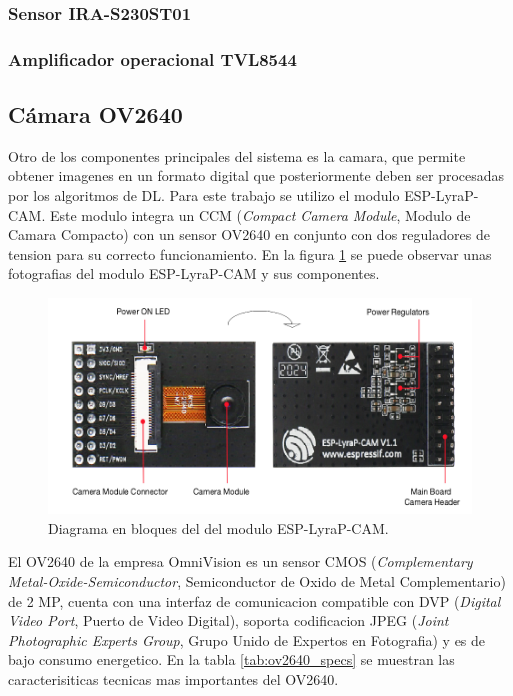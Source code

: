 \subsubsection{Sensor IRA-S230ST01}


\subsubsection{Amplificador operacional TVL8544}

\subsection{Cámara OV2640}
Otro de los componentes principales del sistema es la camara, que permite obtener imagenes en un formato digital que posteriormente deben ser procesadas por los algoritmos de DL. Para este trabajo se utilizo el modulo ESP-LyraP-CAM. Este modulo integra un CCM (\textit{Compact Camera Module}, Modulo de Camara Compacto) con un sensor OV2640 en conjunto con dos reguladores de tension para su correcto funcionamiento. En la figura \ref{fig:camera_blocks} se puede observar unas fotografias del modulo ESP-LyraP-CAM y sus componentes.

\begin{figure}[h]
	\centering
	\includegraphics[scale=0.5]{./Figures/camera_blocks.png}
	\caption{Diagrama en bloques del del modulo ESP-LyraP-CAM.}
	\label{fig:camera_blocks}
\end{figure}

El OV2640 de la empresa OmniVision es un sensor CMOS (\textit{Complementary Metal-Oxide-Semiconductor}, Semiconductor de Oxido de Metal Complementario) de 2 MP, cuenta con una interfaz de comunicacion compatible con DVP  (\textit{Digital Video Port}, Puerto de Video Digital), soporta codificacion JPEG (\textit{Joint Photographic Experts Group}, Grupo Unido de Expertos en Fotografia) y es de bajo consumo energetico. En la tabla \ref{tab:ov2640_specs} se muestran las caracterisiticas tecnicas mas importantes del OV2640.


